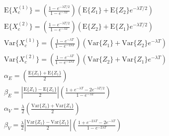 \documentclass[12pt]{iopart}
\begin{document}
\begin{align}
\mathrm{E}\{X_c^{(1)}\} = \left(\frac{1-e^{-\lambda T/2}}{1-e^{-\lambda T}}\right)\left(\mathrm{E}\{Z_1\} + \mathrm{E}\{Z_2\} e^{-\lambda T/2}\right) \\
\mathrm{E}\{X_c^{(2)}\} = \left(\frac{1-e^{-\lambda T/2}}{1-e^{-\lambda T}}\right)\left(\mathrm{E}\{Z_2\} + \mathrm{E}\{Z_1\} e^{-\lambda T/2}\right) \\
\mathrm{Var}\{X_c^{(1)}\} = \left(\frac{1-e^{-\lambda T}}{1-e^{-2 \lambda T}}\right)\left(\mathrm{Var}\{Z_1\} + \mathrm{Var}\{Z_2\} e^{-\lambda T}\right)\\
\mathrm{Var}\{X_c^{(2)}\} = \left(\frac{1-e^{-\lambda T}}{1-e^{-2 \lambda T}}\right)\left(\mathrm{Var}\{Z_2\} + \mathrm{Var}\{Z_1\} e^{-\lambda T}\right)\\
\alpha_E = \left(\frac{\mathrm{E}\{Z_1\}+\mathrm{E}\{Z_1\}}{2}\right)\\
\beta_E =  \left\vert\frac{\mathrm{E}\{Z_1\}-\mathrm{E}\{Z_1\}}{2}\right\vert\left(\frac{1+e^{-\lambda T}-2 e^{-\lambda T/2}}{1-e^{-\lambda T}}\right)\\
\alpha_V = \frac{\lambda}{2}\left(\frac{\mathrm{Var}\{Z_1\}+\mathrm{Var}\{Z_1\}}{2}\right)\\
\beta_V = \frac{\lambda}{2}\left\vert\frac{\mathrm{Var}\{Z_1\}-\mathrm{Var}\{Z_1\}}{2}\right\vert\left(\frac{1+e^{-2\lambda T}-2 e^{-\lambda T}}{1-e^{-2\lambda T}}\right)\\
\end{align}
\end{document}
